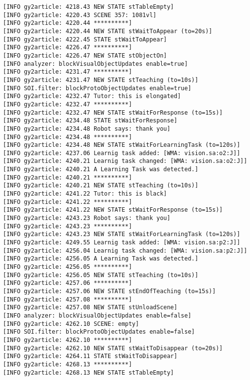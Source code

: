 \documentclass{article}
\begin{document}
\begin{verbatim}
[INFO gy2article: 4218.43 NEW STATE stTableEmpty]
[INFO gy2article: 4220.43 SCENE 357: 1081vl]
[INFO gy2article: 4220.44 **********]
[INFO gy2article: 4220.44 NEW STATE stWaitToAppear (to=20s)]
[INFO gy2article: 4222.45 STATE stWaitToAppear]
[INFO gy2article: 4226.47 **********]
[INFO gy2article: 4226.47 NEW STATE stObjectOn]
[INFO analyzer: blockVisualObjectUpdates enable=true]
[INFO gy2article: 4231.47 **********]
[INFO gy2article: 4231.47 NEW STATE stTeaching (to=10s)]
[INFO SOI.filter: blockProtoObjectUpdates enable=true]
[INFO gy2article: 4232.47 Tutor: this is elongated]
[INFO gy2article: 4232.47 **********]
[INFO gy2article: 4232.47 NEW STATE stWaitForResponse (to=15s)]
[INFO gy2article: 4234.48 STATE stWaitForResponse]
[INFO gy2article: 4234.48 Robot says: thank you]
[INFO gy2article: 4234.48 **********]
[INFO gy2article: 4234.48 NEW STATE stWaitForLearningTask (to=120s)]
[INFO gy2article: 4237.06 Learnig task added: [WMA: vision.sa:o2:J]]
[INFO gy2article: 4240.21 Learnig task changed: [WMA: vision.sa:o2:J]]
[INFO gy2article: 4240.21 A Learning Task was detected.]
[INFO gy2article: 4240.21 **********]
[INFO gy2article: 4240.21 NEW STATE stTeaching (to=10s)]
[INFO gy2article: 4241.22 Tutor: this is black]
[INFO gy2article: 4241.22 **********]
[INFO gy2article: 4241.22 NEW STATE stWaitForResponse (to=15s)]
[INFO gy2article: 4243.23 Robot says: thank you]
[INFO gy2article: 4243.23 **********]
[INFO gy2article: 4243.23 NEW STATE stWaitForLearningTask (to=120s)]
[INFO gy2article: 4249.55 Learnig task added: [WMA: vision.sa:p2:J]]
[INFO gy2article: 4256.04 Learnig task changed: [WMA: vision.sa:p2:J]]
[INFO gy2article: 4256.05 A Learning Task was detected.]
[INFO gy2article: 4256.05 **********]
[INFO gy2article: 4256.05 NEW STATE stTeaching (to=10s)]
[INFO gy2article: 4257.06 **********]
[INFO gy2article: 4257.06 NEW STATE stEndOfTeaching (to=15s)]
[INFO gy2article: 4257.08 **********]
[INFO gy2article: 4257.08 NEW STATE stUnloadScene]
[INFO analyzer: blockVisualObjectUpdates enable=false]
[INFO gy2article: 4262.10 SCENE: empty]
[INFO SOI.filter: blockProtoObjectUpdates enable=false]
[INFO gy2article: 4262.10 **********]
[INFO gy2article: 4262.10 NEW STATE stWaitToDisappear (to=20s)]
[INFO gy2article: 4264.11 STATE stWaitToDisappear]
[INFO gy2article: 4268.13 **********]
[INFO gy2article: 4268.13 NEW STATE stTableEmpty]
\end{verbatim}
\end{document}
